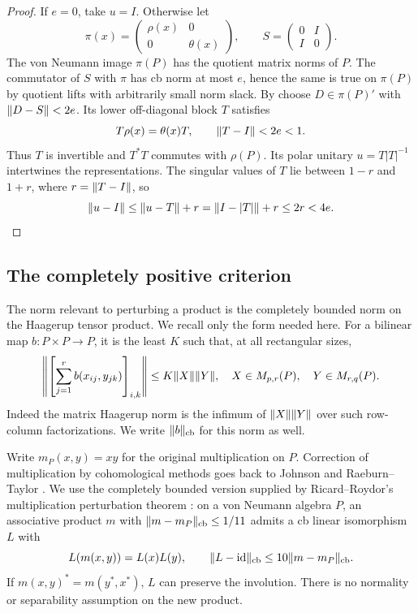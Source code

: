 \begin{proof}
If $e=0$, take $u=I$. Otherwise let
\[
 \pi(x)=\begin{pmatrix}\rho(x)&0\\0&\theta(x)\end{pmatrix},
 \qquad S=\begin{pmatrix}0&I\\I&0\end{pmatrix}.
\]
The von Neumann image $\pi(P)$ has the quotient matrix norms of $P$.
The commutator of $S$ with $\pi$ has cb norm at most $e$, hence the
same is true on $\pi(P)$ by quotient lifts with arbitrarily small
norm slack. By  choose $D\in\pi(P)'$ with
$\lVert D-S\rVert<2e$. Its lower off-diagonal block $T$ satisfies
\[
 T\rho(x)=\theta(x)T,\qquad \lVert T-I\rVert<2e<1.
\]
Thus $T$ is invertible and $T^*T$ commutes with $\rho(P)$.
Its polar unitary $u=T|T|^{-1}$ intertwines the representations.
The singular values of $T$ lie between $1-r$ and $1+r$, where
$r=\lVert T-I\rVert$, so
\[
 \lVert u-I\rVert\le\lVert u-T\rVert+r=\lVert I-|T|\rVert+r\le2r<4e.
\]
\end{proof}

\subsection{The completely positive criterion}

The norm relevant to perturbing a product is the completely bounded
norm on the Haagerup tensor product. We recall only the form needed
here. For a bilinear map $b:P\times P\to P$, it is the least $K$ such
that, at all rectangular sizes,
\begin{equation}\label{eq:haagerup-products}
 \left\|\left[\sum_{j=1}^r b(x_{ij},y_{jk})\right]_{i,k}\right\|
 \le K\lVert X\rVert\lVert Y\rVert,
 \quad X\in M_{p,r}(P),\quad Y\in M_{r,q}(P).
\end{equation}
Indeed the matrix Haagerup norm is the infimum of $\lVert X\rVert\lVert Y\rVert$
over such row-column factorizations. We write $\lVert b\rVert_{\mathrm{cb}}$ for
this norm as well.

Write $m_P(x,y)=xy$ for the original multiplication on $P$.
Correction of multiplication by cohomological methods goes back to
Johnson and Raeburn--Taylor
\cite{Johnson1977,RaeburnTaylor1977}. We use the completely bounded
version supplied by Ricard--Roydor's multiplication perturbation theorem
\cite[Proposition~3.2]{RicardRoydor2014}: on a von Neumann algebra $P$,
an associative product $m$ with
$\lVert m-m_P\rVert_{\mathrm{cb}}\le1/11$ admits a cb linear isomorphism $L$ with
\[
 L(m(x,y))=L(x)L(y),\qquad
 \lVert L-\operatorname{id}\rVert_{\mathrm{cb}}\le10\lVert m-m_P\rVert_{\mathrm{cb}}.
\]
If $m(x,y)^*=m(y^*,x^*)$, $L$ can preserve the involution.
There is no normality or separability assumption on the new product.

